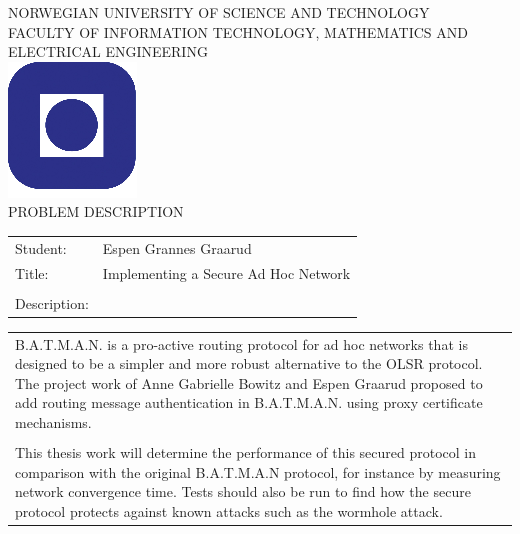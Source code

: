 
%
\setlength{\parindent}{0pt} 
\setlength{\parskip}{2ex}
\begin{titlepage}
\begin{center}
\textsc{NORWEGIAN UNIVERSITY OF SCIENCE AND TECHNOLOGY\\
FACULTY OF  INFORMATION TECHNOLOGY, MATHEMATICS AND ELECTRICAL ENGINEERING} \\
\vspace{0.5cm} 
\includegraphics[scale=0.5]{images/NTNU_logo.png} \\

\vspace{1.0cm}
{\Huge{PROBLEM DESCRIPTION}}
\vspace{1.0cm}

\begin{tabular}{ p{4cm} p{11cm}}

Student:	& Espen Grannes Graarud \\
Title: & Implementing a Secure Ad Hoc Network \\\\
Description: & \\
\end{tabular}
{\small{\begin{tabular}{p{15cm}}
\vspace{0.2cm}
 
B.A.T.M.A.N. is a pro-active routing protocol for ad hoc networks that is
designed to be a simpler and more robust alternative to the OLSR protocol. The
project work of Anne Gabrielle Bowitz and Espen Graarud proposed to add routing
message authentication in B.A.T.M.A.N. using proxy certificate mechanisms.
\\\\
This thesis work will determine the performance of this secured protocol
in comparison with the original B.A.T.M.A.N protocol, for instance by
measuring network convergence time. Tests should also be run to find how the
secure protocol protects against known attacks such as the wormhole attack.



\end{tabular}}}
\end{center}
\end{titlepage}
